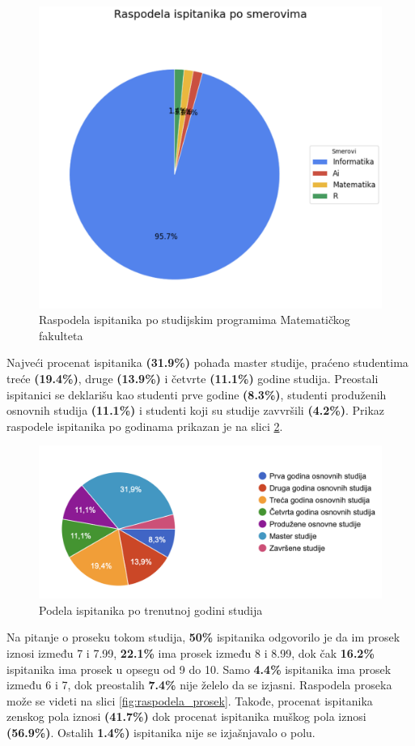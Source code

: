 \documentclass[a4paper]{article}
\begin{document}
{\begin{figure}[H]
    \centering
    \includegraphics[width=0.5\linewidth]{raspodela_ispitanika.png}
    \caption{Raspodela ispitanika po studijskim programima Matematičkog fakulteta}
    \label{fig:raspodela_smerovi}
\end{figure}


Najveći procenat ispitanika \textbf{(31.9\%)} pohađa master studije, praćeno studentima treće \textbf{(19.4\%)}, druge \textbf{(13.9\%)} i četvrte \textbf{(11.1\%)} godine studija. Preostali ispitanici se deklarišu kao studenti prve godine \textbf{(8.3\%)}, studenti produženih osnovnih studija \textbf{(11.1\%)} i studenti koji su studije zavvršili \textbf{(4.2\%)}. Prikaz raspodele ispitanika po godinama prikazan je na slici \ref{fig:raspodela_godine}.

\begin{figure}[H]
    \centering
    \includegraphics[width=0.8\linewidth]{raspodela_godine.png}
    \caption{Podela ispitanika po trenutnoj godini studija}
    \label{fig:raspodela_godine}
\end{figure}


Na pitanje o proseku tokom studija, \textbf{50\%} ispitanika odgovorilo je da im prosek iznosi između 7 i 7.99, \textbf{22.1\%} ima prosek između 8 i 8.99, dok čak \textbf{16.2\%} ispitanika ima prosek u opsegu od 9 do 10. Samo \textbf{4.4\%} ispitanika ima prosek između 6 i 7, dok preostalih \textbf{7.4\%} nije želelo da se izjasni. Raspodela proseka može se videti na slici \ref{fig:raspodela_prosek}. Takođe, procenat ispitanika zenskog pola iznosi  \textbf{(41.7\%)} dok procenat ispitanika muškog pola iznosi \textbf{(56.9\%)}. Ostalih \textbf{1.4\%)} ispitanika nije se izjašnjavalo o polu.

}
\end{document}
